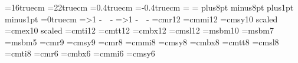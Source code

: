 \magnification {}
\newdimen\papwidth
\newdimen\papheight
\newskip\beforesectionskipamount  %
\newskip\sectionskipamount %
\def\sectionskip{\vskip\sectionskipamount}
\def\beforesectionskip{\vskip\beforesectionskipamount}
\papwidth=16truecm
\papheight=22truecm
\voffset=0.4truecm
\hoffset=-0.4truecm
\hsize=\papwidth
\vsize=\papheight
\normalbaselineskip=5.25mm
\baselineskip=5.25mm
\parskip=0pt
\parindent=10pt
\beforesectionskipamount=36pt plus8pt minus8pt
\sectionskipamount=3pt plus1pt minus1pt
\nopagenumbers
\newdimen\texpscorrection
\texpscorrection=0truecm %
\headline={\ifnum\pageno>1 {\hss\tenrm-\ \folio\ -\hss} \else {\hfill}\fi}
\def\titlesize{\twelvepoint}
\def\sectionsize{\twelvepoint}
\def\subsectionsize{}
\def\titletype{\bf}
\def\sectiontype{\bf}
\def\subsectiontype{\bf}
\def\em{\sl}  %
\nopagenumbers
\headline={\ifnum\pageno>1 {\hss\tenrm-\ \folio\ -\hss} \else {\hfill}\fi}
%
\font\twelverm=cmr12
\font\twelvei=cmmi12
\font\twelvesy=cmsy10 scaled
\font\twelveex=cmex10 scaled
\font\twelveit=cmti12
\font\twelvett=cmtt12
\font\twelvebf=cmbx12 
\font\twelvesl=cmsl12 
\font\tenmsb=msbm10
\font\sevenmsb=msbm7
\font\fivemsb=msbm5
\newfam\msbfam
\font\ninerm=cmr9
\font\ninesy=cmsy9
\font\eightrm=cmr8
\font\eighti=cmmi8
\font\eightsy=cmsy8
\font\eightbf=cmbx8
\font\eighttt=cmtt8
\font\eightsl=cmsl8
\font\eightit=cmti8
\font\sixrm=cmr6
\font\sixbf=cmbx6
\font\sixi=cmmi6
\font\sixsy=cmsy6

